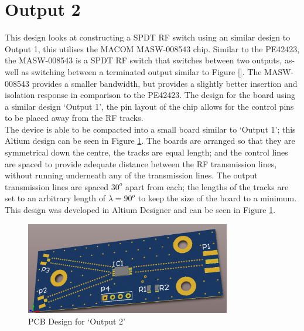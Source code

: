 \documentclass[12pt,openany,a4paper]{book}
\begin{document}
\section{Output 2}		\label{sec:output2}
This design looks at constructing a SPDT RF switch using an similar design to Output 1, this utilises the MACOM MASW-008543
chip. Similar to the PE42423, the MASW-008543 is a SPDT RF switch that switches between two outputs, as-well as switching between a terminated output similar to Figure \ref{}. The MASW-008543 provides a smaller bandwidth, but provides a slightly better insertion and isolation response in comparison to the PE42423. The design for the board using a similar design `Output 1', the pin layout of the chip allows for the control pins to be placed away from the RF tracks.\\[0.2cm]
The device is able to be compacted into a small board similar to `Output 1'; this Altium design can be seen in Figure \ref{fig:output2}. The boards are arranged so that they are symmetrical down the centre, the tracks are equal length; and the control lines are spaced to provide adequate distance between the RF transmission lines, without running underneath any of the transmission lines. The output transmission lines are spaced $30^o$ apart from each; the lengths of the tracks are set to an arbitrary length of $\lambda=90^o$ to keep the size of the board to a minimum.\\[0.2cm]
This design was developed in Altium Designer and can be seen in Figure \ref{fig:output2}.
\begin{figure}[H]
	\centering
    \includegraphics[width=0.8\textwidth]{output2_pcb.png}
	\caption{PCB Design for `Output 2'}
	\label{fig:output2}
\end{figure} 
\end{document}
